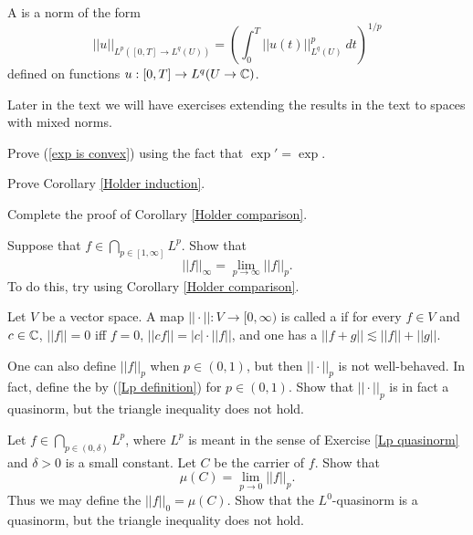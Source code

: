 \begin{definition}
A  is a norm of the form
\[||u||_{L^p([0, T] \to L^q(U))} = \left(\int_0^T ||u(t)||_{L^q(U)}^p~dt\right)^{1/p}\]
defined on functions $u: [0, T] \to L^q(U \to \mathbb{C})$.
\end{definition}

Later in the text we will have exercises extending the results in the text to spaces with mixed norms.

\begin{exercise}
\label{exp is convex exer}
Prove (\ref{exp is convex}) using the fact that $\exp' = \exp$.
\end{exercise}

\begin{exercise}
\label{Holder induction exer}
Prove Corollary \ref{Holder induction}.
\end{exercise}

\begin{exercise}
\label{granular comparison}
Complete the proof of Corollary \ref{Holder comparison}.
\end{exercise}

\begin{exercise}
Suppose that $f \in \bigcap_{p \in [1, \infty]} L^p$. Show that
\[||f||_\infty = \lim_{p \to \infty} ||f||_p.\]
To do this, try using Corollary \ref{Holder comparison}.
\end{exercise}

\begin{definition}
Let $V$ be a vector space.
A map $||\cdot||: V \to [0, \infty)$ is called a  if for every $f \in V$ and $c \in \mathbb{C}$, $||f|| = 0$ iff $f = 0$, $||cf|| = |c|\cdot||f||$, and one has a  $||f + g|| \lesssim ||f|| + ||g||$.
\end{definition}

\begin{exercise}
\label{Lp quasinorm}
One can also define $||f||_p$ when $p \in (0, 1)$, but then $||\cdot||_p$ is not well-behaved.
In fact, define the  by (\ref{Lp definition}) for $p \in (0, 1)$.
Show that $||\cdot||_p$ is in fact a quasinorm, but the triangle inequality does not hold.
\end{exercise}

\begin{exercise}
Let $f \in \bigcap_{p \in (0, \delta)} L^p$, where $L^p$ is meant in the sense of Exercise \ref{Lp quasinorm} and $\delta > 0$ is a small constant.
Let $C$ be the carrier of $f$. Show that
\[\mu(C) = \lim_{p \to 0} ||f||_p.\]
Thus we may define the  $||f||_0 = \mu(C)$.
Show that the $L^0$-quasinorm is a quasinorm, but the triangle inequality does not hold.
\end{exercise}

